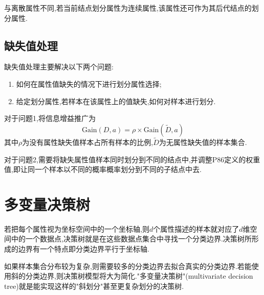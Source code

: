 与离散属性不同,若当前结点划分属性为连续属性,该属性还可作为其后代结点的划分属性.

\subsection{缺失值处理}

缺失值处理主要解决以下两个问题:

\begin{enumerate}
\item 如何在属性值缺失的情况下进行划分属性选择;
\item 给定划分属性,若样本在该属性上的值缺失,如何对样本进行划分.
\end{enumerate}

对于问题1,将信息增益推广为
\begin{equation}
\text{Gain}(D,a)=\rho\times\text{Gain}(\tilde D,a)
\end{equation}
其中$\rho$为没有属性缺失值样本占所有样本的比例,$\tilde D$为无属性缺失值的样本集合.

对于问题2,需要将缺失属性值样本同时划分到不同的结点中,并调整P86定义的权重值,即让同一个样本以不同的概率概率划分到不同的子结点中去.

\section{多变量决策树}

若把每个属性视为坐标空间中的一个坐标轴,则$d$个属性描述的样本就对应了$d$维空间中的一个数据点,决策树就是在这些数据点集合中寻找一个分类边界.决策树所形成的边界有一个特点即分类边界平行于坐标轴.

如果样本集合分布较为复杂,则需要较多的分类边界去拟合真实的分类边界.若能使用斜的分类边界,则决策树模型将大为简化."多变量决策树"(multivariate decision tree)就是能实现这样的"斜划分"甚至更复杂划分的决策树.
